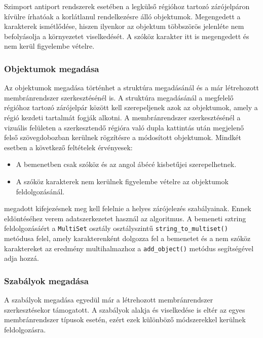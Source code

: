 Szimport antiport rendszerek esetében a legkülső régióhoz tartozó zárójelpáron kívülre írhatóak a korlátlanul rendelkezésre álló objektumok. Megengedett a karakterek ismétlődése, hiszen ilyenkor  az objektum többszörös jelenléte nem befolyásolja a környezetet viselkedését. A szóköz karakter itt is megengedett és nem kerül figyelembe vételre.

\subsubsection{Objektumok megadása}
Az objektumok megadása történhet a struktúra megadásánál és a már létrehozott membránrendszer szerkesztésénél is. A struktúra megadásánál a megfelelő régióhoz tartozó zárójelpár között kell szerepeljenek azok az objektumok, amely a régió kezdeti tartalmát fogják alkotni. A membránrendszer szerkesztésénél a vizuális felületen a szerkesztendő régióra való dupla kattintás után megjelenő felső szövegdobozban kerülnek rögzítésre a módosított objektumok. Mindkét esetben a következő feltételek érvényesek:

\begin{itemize}
\item A bemenetben csak szóköz és az angol ábécé kisbetűjei szerepelhetnek.
\item A szóköz karakterek nem kerülnek figyelembe vételre az objektumok feldolgozásánál.
\end{itemize}
megadott kifejezésnek meg kell felelnie a helyes zárójelezés szabályainak. Ennek eldöntéséhez verem adatszerkezetet használ az algoritmus.
A bemeneti sztring feldolgozásáért a \verb|MultiSet| osztály osztályszintű \verb|string_to_multiset()| metódusa felel, amely karakterenként dolgozza fel a bemenetet és a nem szóköz karaktereket az eredmény multihalmazhoz a \verb|add_object()| metódus segítségével adja hozzá.

\subsubsection{Szabályok megadása}

A szabályok megadása egyedül már a létrehozott membránrendszer szerkesztésekor támogatott. A szabályok alakja és viselkedése is eltér az egyes membránrendszer típusok esetén, ezért ezek különböző módszerekkel kerülnek feldolgozásra.

